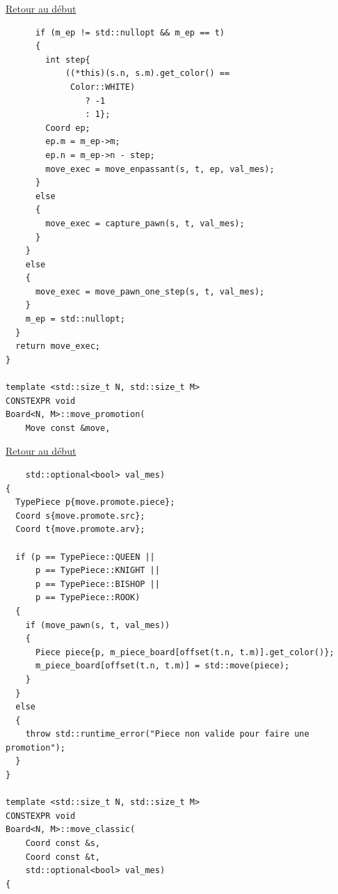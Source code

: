 {\begin{frame}[fragile]
\hyperlink{conclusion}{Retour au début}\newline
\begin{verbatim}
      if (m_ep != std::nullopt && m_ep == t)
      {
        int step{
            ((*this)(s.n, s.m).get_color() ==
             Color::WHITE)
                ? -1
                : 1};
        Coord ep;
        ep.m = m_ep->m;
        ep.n = m_ep->n - step;
        move_exec = move_enpassant(s, t, ep, val_mes);
      }
      else
      {
        move_exec = capture_pawn(s, t, val_mes);
      }
    }
    else
    {
      move_exec = move_pawn_one_step(s, t, val_mes);
    }
    m_ep = std::nullopt;
  }
  return move_exec;
}

template <std::size_t N, std::size_t M>
CONSTEXPR void
Board<N, M>::move_promotion(
    Move const &move,
\end{verbatim}
\end{frame}

\begin{frame}[fragile]
\hyperlink{conclusion}{Retour au début}\newline
\begin{verbatim}
    std::optional<bool> val_mes)
{
  TypePiece p{move.promote.piece};
  Coord s{move.promote.src};
  Coord t{move.promote.arv};

  if (p == TypePiece::QUEEN ||
      p == TypePiece::KNIGHT ||
      p == TypePiece::BISHOP ||
      p == TypePiece::ROOK)
  {
    if (move_pawn(s, t, val_mes))
    {
      Piece piece{p, m_piece_board[offset(t.n, t.m)].get_color()};
      m_piece_board[offset(t.n, t.m)] = std::move(piece);
    }
  }
  else
  {
    throw std::runtime_error("Piece non valide pour faire une promotion");
  }
}

template <std::size_t N, std::size_t M>
CONSTEXPR void
Board<N, M>::move_classic(
    Coord const &s,
    Coord const &t,
    std::optional<bool> val_mes)
{
\end{verbatim}
\end{frame}

}
